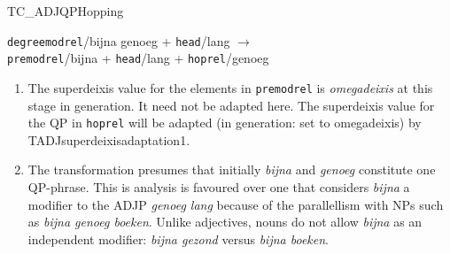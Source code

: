 \begin{mruleclass}{TC\_ADJQPHopping}
\begin{members}
\begin{member}
{\tt degreemodrel}/bijna genoeg + {\tt head}/lang $\rightarrow$ \\
{\tt premodrel}/bijna + {\tt head}/lang + {\tt hoprel}/genoeg
\remarks\mbox{}

\begin{enumerate}
\item 
The superdeixis value for the elements in {\tt premodrel} is {\em omegadeixis}
 at this 
stage in generation. It need not be adapted here. The superdeixis  value for 
the 
QP in {\tt hoprel} will be adapted (in generation: set to omegadeixis) by TADJsuperdeixisadaptation1.
\item 


The transformation presumes that initially 
{\em bijna} and {\em genoeg} constitute
one QP-phrase. This is analysis is favoured over one that considers {\em bijna}
a modifier to the ADJP {\em genoeg lang} because of the parallellism with
NPs such as {\em bijna genoeg boeken}. Unlike adjectives, nouns do not 
allow {\em bijna} as an independent modifier: {\em bijna gezond} versus
{\em *bijna boeken}. 
\end{enumerate}
\end{member}
\end{members}

\end{mruleclass}

